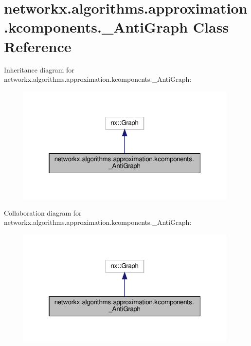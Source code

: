 \hypertarget{classnetworkx_1_1algorithms_1_1approximation_1_1kcomponents_1_1__AntiGraph}{}\section{networkx.\+algorithms.\+approximation.\+kcomponents.\+\_\+\+Anti\+Graph Class Reference}
\label{classnetworkx_1_1algorithms_1_1approximation_1_1kcomponents_1_1__AntiGraph}


Inheritance diagram for networkx.\+algorithms.\+approximation.\+kcomponents.\+\_\+\+Anti\+Graph\+:
\nopagebreak
\begin{figure}[H]
\begin{center}
\leavevmode
\includegraphics[width=313pt]{classnetworkx_1_1algorithms_1_1approximation_1_1kcomponents_1_1__AntiGraph__inherit__graph}
\end{center}
\end{figure}


Collaboration diagram for networkx.\+algorithms.\+approximation.\+kcomponents.\+\_\+\+Anti\+Graph\+:
\nopagebreak
\begin{figure}[H]
\begin{center}
\leavevmode
\includegraphics[width=313pt]{classnetworkx_1_1algorithms_1_1approximation_1_1kcomponents_1_1__AntiGraph__coll__graph}
\end{center}
\end{figure}
